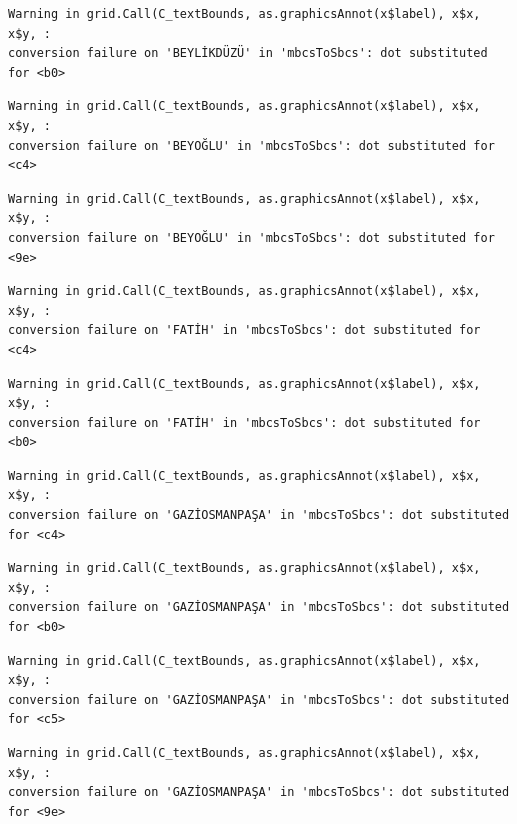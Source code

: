 \documentclass[
  11pt,
  a4paper,
  DIV=11,
  numbers=noendperiod]{scrartcl}
\begin{document}
\begin{verbatim}
Warning in grid.Call(C_textBounds, as.graphicsAnnot(x$label), x$x, x$y, :
conversion failure on 'BEYLİKDÜZÜ' in 'mbcsToSbcs': dot substituted for <b0>
\end{verbatim}

\begin{verbatim}
Warning in grid.Call(C_textBounds, as.graphicsAnnot(x$label), x$x, x$y, :
conversion failure on 'BEYOĞLU' in 'mbcsToSbcs': dot substituted for <c4>
\end{verbatim}

\begin{verbatim}
Warning in grid.Call(C_textBounds, as.graphicsAnnot(x$label), x$x, x$y, :
conversion failure on 'BEYOĞLU' in 'mbcsToSbcs': dot substituted for <9e>
\end{verbatim}

\begin{verbatim}
Warning in grid.Call(C_textBounds, as.graphicsAnnot(x$label), x$x, x$y, :
conversion failure on 'FATİH' in 'mbcsToSbcs': dot substituted for <c4>
\end{verbatim}

\begin{verbatim}
Warning in grid.Call(C_textBounds, as.graphicsAnnot(x$label), x$x, x$y, :
conversion failure on 'FATİH' in 'mbcsToSbcs': dot substituted for <b0>
\end{verbatim}

\begin{verbatim}
Warning in grid.Call(C_textBounds, as.graphicsAnnot(x$label), x$x, x$y, :
conversion failure on 'GAZİOSMANPAŞA' in 'mbcsToSbcs': dot substituted for <c4>
\end{verbatim}

\begin{verbatim}
Warning in grid.Call(C_textBounds, as.graphicsAnnot(x$label), x$x, x$y, :
conversion failure on 'GAZİOSMANPAŞA' in 'mbcsToSbcs': dot substituted for <b0>
\end{verbatim}

\begin{verbatim}
Warning in grid.Call(C_textBounds, as.graphicsAnnot(x$label), x$x, x$y, :
conversion failure on 'GAZİOSMANPAŞA' in 'mbcsToSbcs': dot substituted for <c5>
\end{verbatim}

\begin{verbatim}
Warning in grid.Call(C_textBounds, as.graphicsAnnot(x$label), x$x, x$y, :
conversion failure on 'GAZİOSMANPAŞA' in 'mbcsToSbcs': dot substituted for <9e>
\end{verbatim}
\end{document}
